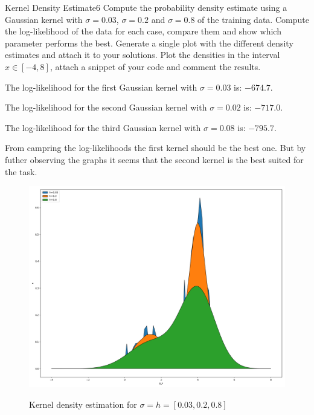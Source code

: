 \begin{questions}

\begin{question}{Kernel Density Estimate}{6}
Compute the probability density estimate using a Gaussian kernel with $\sigma=0.03$, $\sigma=0.2$ and $\sigma=0.8$ of the training data. Compute the log-likelihood of the data for each case, compare them and show which parameter performs the best.
Generate a single plot with the different density estimates and attach it to your solutions. Plot the densities in the interval $x \in [-4,8]$, attach a snippet of your code and comment the results.

\begin{answer}
The log-likelihood for the first Gaussian kernel with $\sigma = 0.03$ is: $-674.7$. 

The log-likelihood for the second Gaussian kernel with $\sigma = 0.02$ is: $-717.0$. 

The log-likelihood for the third Gaussian kernel with $\sigma = 0.08$ is: $-795.7$. 

From campring the log-likelihoods the first kernel should be the best one. But by futher observing the graphs it seems that the second kernel is the best suited for the task.
\end{answer}
\end{question}

\begin{figure}[!h]
	\includegraphics[width=0.7\linewidth]{pictures/kdplot.png}
	\centering
	\label{kd}
	\caption{Kernel density estimation for $\sigma = h = [0.03, 0.2, 0.8]$}
\end{figure}


\end{questions}
